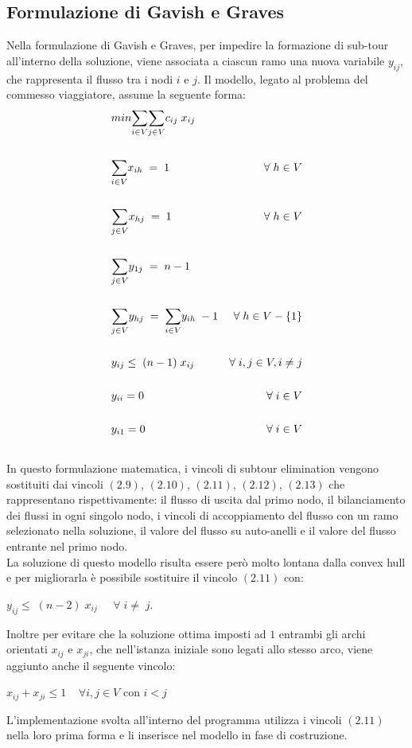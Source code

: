 \subsection{Formulazione di Gavish e Graves}
Nella formulazione di Gavish e Graves, per impedire la formazione di sub-tour all'interno della soluzione, viene associata a ciascun ramo una nuova variabile $y_{ij}$, che rappresenta il flusso tra i nodi $i$ e $j$. Il modello, legato al problema del commesso viaggiatore, assume la seguente forma:
\begin{align}
& min\underset{i\in V}\sum{\underset{j\in V}\sum{c_{ij}\; x_{ij}}} \\ \notag \\
& \underset{i\in V}\sum{x_{ih}}\;=\;1 & \forall\;h\in V \\ \notag\\
& \underset{j\in V}\sum{x_{hj}}\;=\;1 & \forall\;h\in V \\ \notag\\
& \underset{j\in V}\sum{y_{1j}}\;=\;n-1\\ \notag\\
& \underset{j\in V}\sum{y_{hj}}\;=\;\underset{i\in V}\sum{y_{ih}}\;-1 & \forall\;h\in V-\{1\}\\ \notag\\
& y_{ij}\leq\;(n-1)\;x_{ij} & \forall\;i,j\in V, i\neq j\\ \notag\\
& y_{ii}=0 & \forall\;i\in V\\\notag\\
& y_{i1}=0 & \forall\;i\in V\\\notag
\end{align}
In questo formulazione matematica, i vincoli di subtour elimination vengono sostituiti dai vincoli $(2.9)$, $(2.10)$, $(2.11)$, $(2.12)$, $(2.13)$ che rappresentano rispettivamente: il flusso di uscita dal primo nodo, il bilanciamento dei flussi in ogni singolo nodo, i vincoli di accoppiamento del flusso con un ramo selezionato nella soluzione, il valore del flusso su auto-anelli e il valore del flusso entrante nel primo nodo.\\
La soluzione di questo modello risulta essere però molto lontana dalla convex hull e per migliorarla è possibile sostituire il vincolo $(2.11)$ con: \\
\begin{center}
$y_{ij}\leq\;(n-2)\;x_{ij} \;\;\;\;\;\forall\; i\neq \; j$.\\
\end{center} 
Inoltre per evitare che la soluzione ottima imposti ad $1$ entrambi gli archi orientati $x_{ij}$ e $x_{ji}$, che nell'istanza iniziale sono legati allo stesso arco, viene aggiunto anche il seguente vincolo:
\begin{center}
$x_{ij}+x_{ji}\leq 1\;\;\;\; \forall i,j \in V$ con $i < j$
\end{center}
L'implementazione svolta all'interno del programma utilizza i vincoli $(2.11)$ nella loro prima forma e li inserisce nel modello in fase di costruzione.

